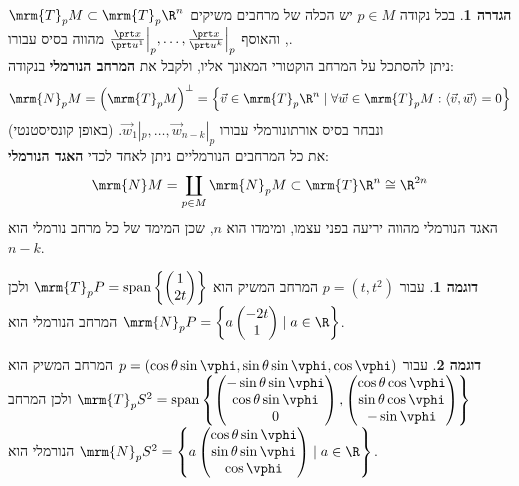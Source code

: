 \documentclass{article}
\theoremstyle{definition}
\newtheorem*{definition*}{הגדרה}
\newtheorem*{example*}{דוגמה}
\DeclareMathOperator{\spn}{span}
\begin{document}
	\begin{definition*}
		בכל נקודה
		$p\in M$
		יש הכלה של מרחבים משיקים
		\(\mrm{T}_p M \subset \mrm{T}_p \R^n\),
		והאוסף
		\(\frac{\prt x}{\prt u^1}\Big|_p,\dotsc,\frac{\prt x}{\prt u^k}\Big|_p\)
		מהווה בסיס עבורו.
		\\
		ניתן להסתכל על המרחב הוקטורי המאונך אליו, ולקבל את \textbf{המרחב הנורמלי} בנקודה:
		\[
			\mrm{N}_p M
			= \left(\mrm{T}_p M\right)^\bot
			= \left\{
				\vec{v} \in \mrm{T}_p \R^n
				\mid
				\forall \vec{w} \in \mrm{T}_p M: \langle \vec{v},\vec{w} \rangle=0
			\right\}
		\]
		ונבחר בסיס אורתונורמלי עבורו
		\(\vec{w}_1|_p,\dotsc,\vec{w}_{n-k}|_p\).
		(באופן קונסיסטנטי)
		\\
		את כל המרחבים הנורמליים ניתן לאחד לכדי \textbf{האגד הנורמלי}:
		\[
			\mrm{N} M
			= \coprod_{p \in M} \mrm{N}_p M
			\subset \mrm{T} \R^n
			\cong \R^{2n}
		\]
		האגד הנורמלי מהווה יריעה בפני עצמו, ומימדו הוא \(n\), שכן המימד של כל מרחב נורמלי הוא \(n-k\).
	\end{definition*}

	\begin{example*}
		עבור
		\(p=(t,t^2)\)
		המרחב המשיק הוא
		\(
			\mrm{T}_p P
			= \spn\left\{
				\begin{pmatrix}
					1\\2t
				\end{pmatrix}
			\right\}
		\)
		ולכן המרחב הנורמלי הוא
		\(
			\mrm{N}_p P
			= \left\{
				a
				\begin{pmatrix}
					-2t\\1
				\end{pmatrix}
				\mid
				a \in \R
			\right\}
		\).
	\end{example*}

	\begin{example*}
		עבור
		\(p=(\cos\theta \sin\vphi, \sin\theta \sin\vphi, \cos\vphi)\)
		המרחב המשיק הוא
		\(
			\mrm{T}_p S^2
			= \spn\left\{
				\begin{pmatrix}
					-\sin\theta \sin\vphi \\ \cos\theta \sin\vphi \\ 0
				\end{pmatrix},
				\begin{pmatrix}
					\cos\theta \cos\vphi \\ \sin\theta \cos\vphi \\ -\sin\vphi
				\end{pmatrix}
			\right\}
		\)
		ולכן המרחב הנורמלי הוא
		\(
			\mrm{N}_p S^2
			= \left\{
				a
				\begin{pmatrix}
					\cos\theta \sin\vphi \\ \sin\theta \sin\vphi \\ \cos\vphi
				\end{pmatrix}
				\mid
				a \in \R
			\right\}
		\).
	\end{example*}
\end{document}
